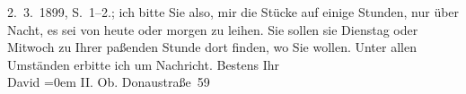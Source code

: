 \begin{ledgroupsized}[t]{13cm}
{{{                                2. 3. 1899, S. 1–2.}}}\label{K_L00894_1h}; ich bitte Sie also,
                    mir die Stücke auf einige
                    Stunden, nur über Nacht, es sei von heute oder morgen zu leihen. Sie sollen sie
                        Dienstag oder Mitwoch zu Ihrer paßenden Stunde
                    dort finden, wo Sie wollen. Unter allen Umständen erbitte ich um Nachricht.\pend
           \pstart
           Bestens Ihr{\\[\baselineskip]}\spacefill\mbox{David}\pend
           \leftskip=0em{}\pstart
           \noindent{}II. Ob. Donaustraße 59\pend
           \endnumbering{}\end{ledgroupsized}  \newcommand{\dateiname}{L00894}\newcommand{\titel}{Jakob Julius David an Arthur Schnitzler, 27. 2. 1899}\newcommand{\editorInnen}{Martin Anton Müller und Gerd-Hermann Susen}
            \footnotesize
\begin{ledgroupsized}[t]{11.5cm}
\end{ledgroupsized}
         
      